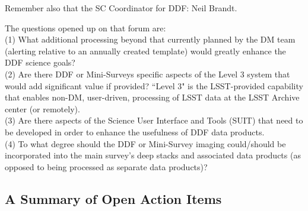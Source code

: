 \documentclass[DM,lsstdraft,toc]{lsstdoc}
\begin{document}
\noindent Remember also that the SC Coordinator for DDF: Neil Brandt.

\noindent The questions opened up on that forum are: \\
(1) What additional processing beyond that currently planned by the DM team (alerting relative to an annually created template) would greatly enhance the DDF science goals? \\
(2) Are there DDF or Mini-Surveys specific aspects of the Level 3 system that would add significant value if provided? ``Level 3" is the LSST-provided capability that enables non-DM, user-driven, processing of LSST data at the LSST Archive center (or remotely). \\
(3) Are there aspects of the Science User Interface and Tools (SUIT) that need to be developed in order to enhance the usefulness of DDF data products. \\
(4) To what degree should the DDF or Mini-Survey imaging could/should be incorporated into the main survey's deep stacks and associated data products (as opposed to being processed as separate data products)?

\subsection{A Summary of Open Action Items} \label{ssec:intro_AI}
\end{document}
